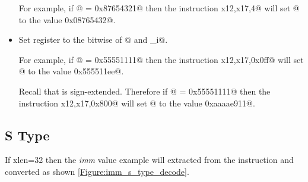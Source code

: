 \begin{itemize}
For example, if @ = \verb@0x87654321@ then the instruction 
\verb@srli x12,x17,4@ will set @ to the value \verb@0x08765432@.

\item{}
\label{insn:xori}

Set register \verb@rd@ to the bitwise \verb@xor@ of @ and \verb@imm_i@.

For example, if @ = \verb@0x55551111@ then the instruction 
\verb@xori x12,x17,0x0ff@ will set @ to the value \verb@0x555511ee@.

Recall that \verb@imm@ is sign-extended.
Therefore if @ = \verb@0x55551111@ then the instruction 
\verb@xori x12,x17,0x800@ will set @ to the value \verb@0xaaaae911@.

\end{itemize}


\subsection{S Type}
\label{insnformat:stype}

If \Gls{xlen}=32 then the {\em imm} value example will extracted from the instruction
and converted as shown \autoref{Figure:imm_s_type_decode}.

\begin{figure}[ht]
\centering
\DrawInsnOpSTypeDecoding
{}
\label{Figure:imm_s_type_decode}
\label{imm.s:decode}
\end{figure}

